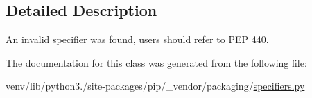 \subsection{Detailed Description}
\begin{DoxyVerb}An invalid specifier was found, users should refer to PEP 440.
\end{DoxyVerb}
 

The documentation for this class was generated from the following file\+:\begin{DoxyCompactItemize}
\item 
venv/lib/python3./site-\/packages/pip/\+\_\+vendor/packaging/\hyperlink{pip_2__vendor_2packaging_2specifiers_8py}{specifiers.\+py}\end{DoxyCompactItemize}
